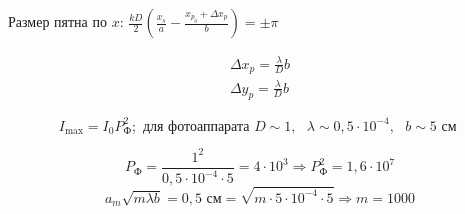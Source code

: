 \documentclass[12pt, a4paper]{report}
\begin{document}
Размер пятна по \( x \): \( \displaystyle  \frac{kD}{2 } \left( \frac{x_s}{a }  - \frac{x_{ p_0 } +\Delta x_p        }{b}  \right) = \pm  \pi \)  

\[ \begin{aligned}
\Delta x_p = \frac{\lambda}{D } b \\ 
\Delta y_p = \frac{\lambda}{D } b
\end{aligned} \] 

\[ I_{ \max  } = I_0 P_{\text{Ф} } ^2; \text{ для фотоаппарата }  D \sim 1 , \text{ }  \lambda \sim  0,5 \cdot 10 ^{-4 } , \text{ }  b \sim  5 \text{ см }    \] 

\[ P_{\text{Ф} } = \frac{1 ^2 }{0, 5 \cdot 10^{-4} \cdot 5 }  = 4 \cdot 10^3  \Rightarrow P_{\text{Ф} } ^2 = 1,6 \cdot 10^{7}     \] 
\[ a_m \sqrt{m \lambda b } = 0,5 \text{ см}= \sqrt{m  \cdot 5 \cdot 10^{-4} \cdot 5       } \Rightarrow m = 1000  \] 


\ifdefined\mainfile
\else
    
\end{document}
